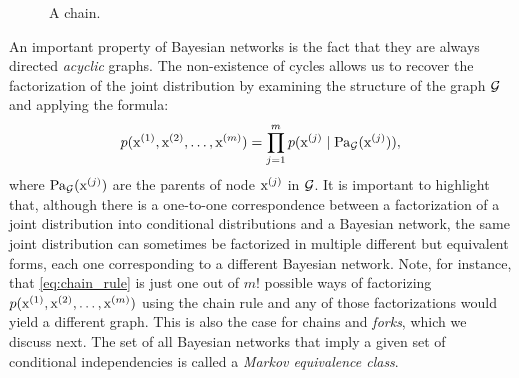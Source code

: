 \begin{figure}
    \centering
    \caption{A chain.}
    \label{fig:chain_bayesian_net}
\end{figure}
An important property of Bayesian networks is the fact that they are always directed \emph{acyclic} graphs. The non-existence of cycles allows us to recover the factorization of the joint distribution by examining the structure of the graph ${\mathcal{G}}$ and applying the formula:
\begin{equation}
    p({\textnormal{x}}^{(1)}, {\textnormal{x}}^{(2)}, \dots, {\textnormal{x}}^{(m)}) = \prod_{j=1}^m p({\textnormal{x}}^{(j)} \mid \mathrm{Pa}_{\mathcal{G}}({\textnormal{x}}^{(j)})),
\end{equation}
where $\mathrm{Pa}_{\mathcal{G}}({\textnormal{x}}^{(j)})$ are the parents of node ${\textnormal{x}}^{(j)}$ in ${\mathcal{G}}$. It is important to highlight that, although there is a one-to-one correspondence between a factorization of a joint distribution into conditional distributions and a Bayesian network, the same joint distribution can sometimes be factorized in multiple different but equivalent forms, each one corresponding to a different Bayesian network. Note, for instance, that \eqref{eq:chain_rule} is just one out of $m!$ possible ways of factorizing $p({\textnormal{x}}^{(1)},{\textnormal{x}}^{(2)},\dots,{\textnormal{x}}^{(m)})$ using the chain rule and any of those factorizations would yield a different graph. This is also the case for chains and \emph{forks}, which we discuss next. The set of all Bayesian networks that imply a given set of conditional independencies is called a \emph{Markov equivalence class}.

